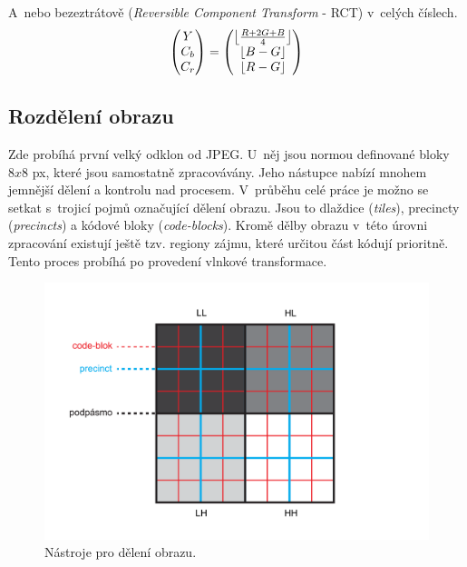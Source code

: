 \noindent A~nebo bezeztrátově (\textit{Reversible Component Transform} - RCT) v~celých číslech.
\begin{gather}
 \begin{pmatrix} Y \\ C_b \\ C_r \end{pmatrix}
 =
 \begin{pmatrix} \floor*{\frac{R + 2G + B}{4}} \\ \floor*{B - G} \\ \floor*{R - G} \end{pmatrix}
\end{gather}

\subsection*{Rozdělení obrazu}
Zde probíhá první velký odklon od JPEG. U~něj jsou normou definované bloky $8x8$ px, které jsou samostatně zpracovávány. Jeho nástupce nabízí mnohem jemnější dělení a kontrolu nad procesem. V~průběhu celé práce je možno se setkat s~trojicí pojmů označující dělení obrazu. Jsou to dlaždice (\textit{tiles}), precincty (\textit{precincts}) a kódové bloky (\textit{code-blocks}). Kromě dělby obrazu v~této úrovni zpracování existují ještě tzv. regiony zájmu, které určitou část kódují prioritně. Tento proces probíhá po provedení vlnkové transformace.

\begin{figure}[hbt!]
  \hspace*{-0.5cm}
  \includegraphics[width=16cm]{obrazky-figures/tiles.pdf}
  \caption{Nástroje pro dělení obrazu.}
  \label{retezec}
\end{figure}

